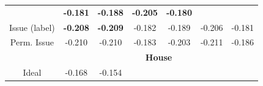 \begin{figure}
\begin{tabular}{|c|cccccc|}
    & \hspace{-4pt} \textbf{-0.181} \hspace{-5pt}
    & \hspace{-4pt} \textbf{-0.188} \hspace{-5pt}
    & \hspace{-4pt} \textbf{-0.205} \hspace{-5pt}
    & \hspace{-4pt} \textbf{-0.180} \hspace{-4pt} \\
    Issue (label)
    & \hspace{-4pt} \textbf{-0.208} \hspace{-5pt}
    & \hspace{-4pt} \textbf{-0.209} \hspace{-5pt}
    & \hspace{-4pt} -0.182 \hspace{-5pt}
    & \hspace{-4pt} -0.189 \hspace{-5pt}
    & \hspace{-4pt} -0.206 \hspace{-5pt}
   & \hspace{-4pt} -0.181 \hspace{-4pt} \\
    \hspace{-5pt} Perm. Issue \hspace{-5pt}
    & \hspace{-4pt} -0.210 \hspace{-5pt}
    & \hspace{-4pt} -0.210 \hspace{-5pt}
    & \hspace{-4pt} -0.183 \hspace{-5pt}
    & \hspace{-4pt} -0.203 \hspace{-5pt}
    & \hspace{-4pt} -0.211 \hspace{-5pt}
    & \hspace{-4pt} -0.186 \hspace{-4pt} \\
    \hline
    \hline
    & \multicolumn{6}{|c|}{\textbf{House}} \\
    \hline
    Ideal & \hspace{-4pt} -0.168 \hspace{-5pt}
    & \hspace{-4pt} -0.154 \hspace{-5pt}

\end{tabular}
\end{figure}
